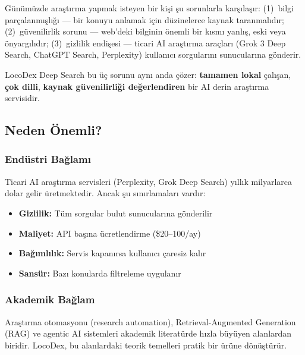 \documentclass[12pt,a4paper,oneside]{book}
\theoremstyle{definition}
\begin{document}
G\"{u}n\"{u}m\"{u}zde ara\c{s}t{\i}rma yapmak isteyen bir ki\c{s}i \c{s}u sorunlarla kar\c{s}{\i}la\c{s}{\i}r: (1)~bilgi par\c{c}alanm{\i}\c{s}l{\i}\u{g}{\i} --- bir konuyu anlamak i\c{c}in d\"{u}zinelerce kaynak taranmal{\i}d{\i}r; (2)~g\"{u}venilirlik sorunu --- web'deki bilginin \"{o}nemli bir k{\i}sm{\i} yanl{\i}\c{s}, eski veya \"{o}nyarg{\i}l{\i}d{\i}r; (3)~gizlilik endi\c{s}esi --- ticari AI ara\c{s}t{\i}rma ara\c{c}lar{\i} (Grok 3 Deep Search, ChatGPT Search, Perplexity) kullan{\i}c{\i} sorgular{\i}n{\i} sunucular{\i}na g\"{o}nderir.

LocoDex Deep Search bu \"{u}\c{c} sorunu ayn{\i} anda \c{c}\"{o}zer: \textbf{tamamen lokal} \c{c}al{\i}\c{s}an, \textbf{\c{c}ok dilli}, \textbf{kaynak g\"{u}venilirli\u{g}i de\u{g}erlendiren} bir AI derin ara\c{s}t{\i}rma servisidir.

\subsection{Neden \"{O}nemli?}

\subsubsection{End\"{u}stri Ba\u{g}lam{\i}}
Ticari AI ara\c{s}t{\i}rma servisleri (Perplexity, Grok Deep Search) y{\i}ll{\i}k milyarlarca dolar gelir \"{u}retmektedir. Ancak \c{s}u s{\i}n{\i}rlamalar{\i} vard{\i}r:
\begin{itemize}
  \item \textbf{Gizlilik:} T\"{u}m sorgular bulut sunucular{\i}na g\"{o}nderilir
  \item \textbf{Maliyet:} API ba\c{s}{\i}na \"{u}cretlendirme (\$20--100/ay)
  \item \textbf{Ba\u{g}{\i}ml{\i}l{\i}k:} Servis kapan{\i}rsa kullan{\i}c{\i} \c{c}aresiz kal{\i}r
  \item \textbf{Sans\"{u}r:} Baz{\i} konularda filtreleme uygulan{\i}r
\end{itemize}

\subsubsection{Akademik Ba\u{g}lam}
Ara\c{s}t{\i}rma otomasyonu (research automation), Retrieval-Augmented Generation (RAG) ve agentic AI sistemleri akademik literat\"{u}rde h{\i}zla b\"{u}y\"{u}yen alanlardan biridir. LocoDex, bu alanlardaki teorik temelleri pratik bir \"{u}r\"{u}ne d\"{o}n\"{u}\c{s}t\"{u}r\"{u}r.
\end{document}
